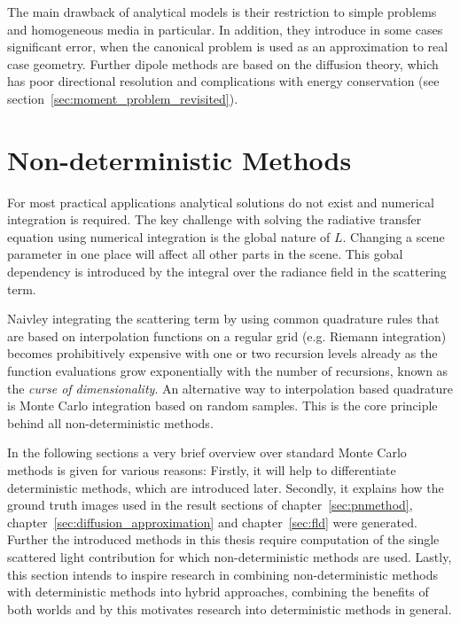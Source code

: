The main drawback of analytical models is their restriction to simple problems and homogeneous media in particular. In addition, they introduce in some cases significant error, when the canonical problem is used as an approximation to real case geometry. Further dipole methods are based on the diffusion theory, which has poor directional resolution and complications with energy conservation (see section~\ref{sec:moment_problem_revisited}).

\section{Non-deterministic Methods}
\label{sec:foundations_mc}

For most practical applications analytical solutions do not exist and numerical integration is required. The key challenge with solving the radiative transfer equation using numerical integration is the global nature of $L$. Changing a scene parameter in one place will affect all other parts in the scene. This gobal dependency is introduced by the integral over the radiance field in the scattering term. 

Naivley integrating the scattering term by using common quadrature rules that are based on interpolation functions on a regular grid (e.g. Riemann integration) becomes prohibitively expensive with one or two recursion levels already as the function evaluations grow exponentially with the number of recursions, known as the \emph{curse of dimensionality}. An alternative way to interpolation based quadrature is Monte Carlo integration based on random samples. This is the core principle behind all non-deterministic methods.

In the following sections a very brief overview over standard Monte Carlo methods is given for various reasons: Firstly, it will help to differentiate deterministic methods, which are introduced later. Secondly, it explains how the ground truth images used in the result sections of chapter~\ref{sec:pnmethod}, chapter~\ref{sec:diffusion_approximation} and chapter~\ref{sec:fld} were generated. Further the introduced methods in this thesis require computation of the single scattered light contribution for which non-deterministic methods are used. Lastly, this section intends to inspire research in combining non-deterministic methods with deterministic methods into hybrid approaches, combining the benefits of both worlds and by this motivates research into deterministic methods in general.

